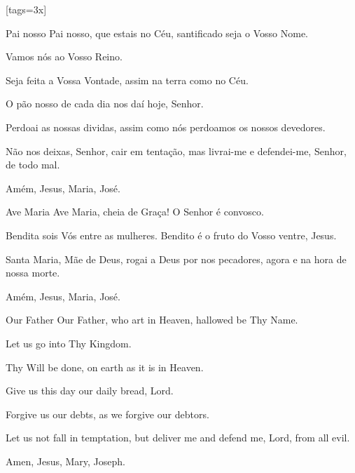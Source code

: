 %

\renewcommand{\thesongnum}{\Roman{songnum}}
\setcounter{songnum}{1}

[tags={3x}]
  \vspace*{3.65ex}
  \begin{passage}[PT]{Pai nosso}
    Pai nosso,
    que estais no Céu,
    santificado seja o Vosso Nome.
    \par
    Vamos nós ao Vosso Reino.
    \par
    Seja feita a Vossa Vontade,
    assim na terra como no Céu.
    \par
    O pão nosso de cada dia nos daí hoje, Senhor.
    \par
    Perdoai as nossas dividas,
    assim como nós perdoamos os nossos devedores.
    \par
    Não nos deixas, Senhor, cair em tentação,
    mas livrai-me e defendei-me, Senhor,
    de todo mal.
    \par
    Amém, Jesus, Maria, José.
  \end{passage}
  \begin{passage}[PT]{Ave Maria}
    Ave Maria,
    cheia de Graça!
    O Senhor é convosco.
    \par
    Bendita sois Vós entre as mulheres.
    Bendito é o fruto do Vosso ventre, Jesus.
    \par
    Santa Maria, Mãe de Deus,
    rogai a Deus por nos pecadores,
    agora e na hora de nossa morte.
    \par
    Amém, Jesus, Maria, José.
  \end{passage}
  \vspace{\fill}
  \hardbrk
  \vspace*{10ex} %
  \begin{passage}[EN]{Our Father}
    Our Father,
    who art in Heaven,
    hallowed be Thy Name.
    \par
    Let us go into Thy Kingdom.
    \par
    Thy Will be done,
    on earth as it is in Heaven.
    \par
    Give us this day our daily bread, Lord.
    \par
    Forgive us our debts,
    as we forgive our debtors.
    \par
    Let us not fall in temptation,
    but deliver me and defend me, Lord,
    from all evil.
    \par
    Amen, Jesus, Mary, Joseph.
  \end{passage}
